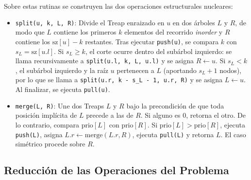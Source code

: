 \documentclass[journal,10pt,a4paper]{IEEEtran}
\begin{document}
Sobre estas rutinas se construyen las dos operaciones estructurales nucleares:
\begin{itemize}
    \item \texttt{split(u, k, L, R)}: Divide el Treap enraizado en $u$ en dos árboles $L$ y $R$, de modo que $L$ contiene los primeros $k$ elementos del recorrido \textit{inorder} y $R$ contiene los $\text{sz}[u] - k$ restantes. Tras ejecutar \texttt{push(u)}, se compara $k$ con $s_L = \text{sz}[u.l]$. Si $s_L \ge k$, el corte ocurre dentro del subárbol izquierdo: se llama recursivamente a \texttt{split(u.l, k, L, u.l)} y se asigna $R \leftarrow u$. Si $s_L < k$, el subárbol izquierdo y la raíz $u$ pertenecen a $L$ (aportando $s_L + 1$ nodos), por lo que se llama a \texttt{split(u.r, k - s\_L - 1, u.r, R)} y se asigna $L \leftarrow u$. Al finalizar, se ejecuta \texttt{pull(u)}.
    \item \texttt{merge(L, R)}: Une dos Treaps $L$ y $R$ bajo la precondición de que toda posición implícita de $L$ precede a las de $R$. Si alguno es $0$, retorna el otro. De lo contrario, compara $\text{prio}[L]$ con $\text{prio}[R]$. Si $\text{prio}[L] > \text{prio}[R]$, ejecuta \texttt{push(L)}, asigna $L.r \leftarrow \text{merge}(L.r, R)$, ejecuta \texttt{pull(L)} y retorna $L$. El caso simétrico procede sobre $R$.
\end{itemize}

\subsection{Reducción de las Operaciones del Problema}
\end{document}
